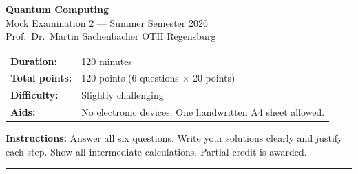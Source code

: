 \documentclass[12pt,a4paper]{exam}
\begin{document}
\begin{center}
  {\LARGE \textbf{Quantum Computing}}\\[0.4em]
  {\large Mock Examination 2 --- Summer Semester 2026}\\[0.3em]
  {\large Prof.\ Dr.\ Martin Sachenbacher \quad OTH Regensburg}\\[1em]
  \begin{tabular}{ll}
    \textbf{Duration:}   & 120 minutes \\
    \textbf{Total points:} & 120 points (6 questions $\times$ 20 points) \\
    \textbf{Difficulty:} & Slightly challenging \\
    \textbf{Aids:}       & No electronic devices. One handwritten A4 sheet allowed. \\
  \end{tabular}
\end{center}

\bigskip
\noindent\textbf{Instructions:} Answer all six questions. Write your solutions clearly and justify each step.
Show all intermediate calculations. Partial credit is awarded.

\bigskip\hrule\bigskip
\end{document}
